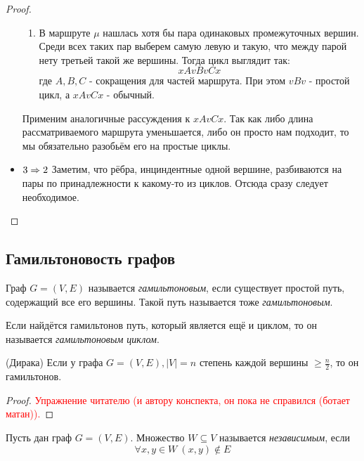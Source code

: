 \begin{proof}
\begin{itemize}
\begin{enumerate}
			\item В маршруте $\mu$ нашлась хотя бы пара одинаковых промежуточных вершин. Среди всех таких пар выберем самую левую и такую, что между парой нету третьей такой же вершины. Тогда цикл выглядит так:
			\[
				xAvBvCx
			\]
			где $A, B, C$ - сокращения для частей маршрута. При этом $vBv$ - простой цикл, а $xAvCx$ - обычный.
		\end{enumerate}
		Применим аналогичные рассуждения к $xAvCx$. Так как либо длина рассматриваемого маршрута уменьшается, либо он просто нам подходит, то мы обязательно разобьём его на простые циклы.
		
		\item $3 \Rightarrow 2$ Заметим, что рёбра, инциндентные одной вершине, разбиваются на пары по принадлежности к какому-то из циклов. Отсюда сразу следует необходимое.
	\end{itemize}
\end{proof}

\subsection*{Гамильтоновость графов}

\begin{definition}
	Граф $G = (V, E)$ называется \textit{гамильтоновым}, если существует простой путь, содержащий все его вершины. Такой путь называется тоже \textit{гамильтоновым}.
\end{definition}

\begin{definition}
	Если найдётся гамильтонов путь, который является ещё и циклом, то он называется \textit{гамильтоновым циклом}.
\end{definition}

\begin{theorem} (Дирака)
	Если у графа $G = (V, E), |V| = n$ степень каждой вершины $\ge \frac{n}{2}$, то он гамильтонов.
\end{theorem}

\begin{proof}
	\textcolor{red}{Упражнение читателю (и автору конспекта, он пока не справился (ботает матан)).}
\end{proof}

\begin{definition}
	Пусть дан граф $G = (V, E)$. Множество $W \subseteq V$ называется \textit{независимым}, если
	\[
		\forall x, y \in W\ (x, y) \notin E
	\]
\end{definition}

